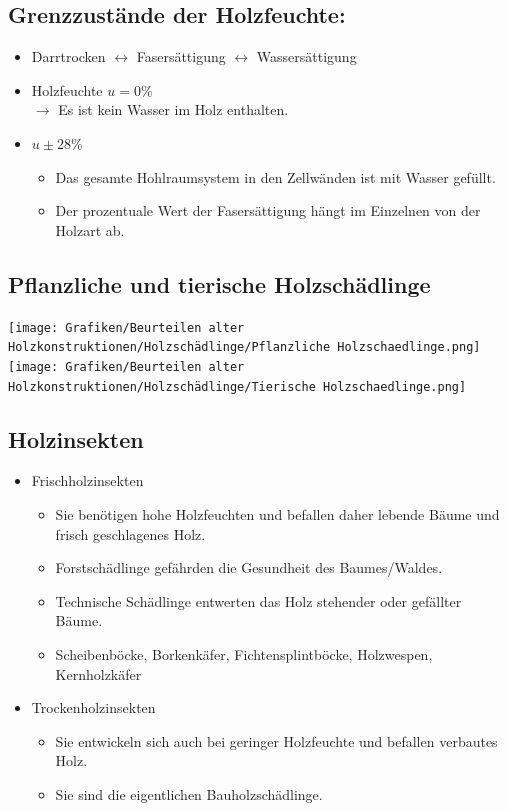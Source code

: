 \documentclass[fleqn,twoside]{article}
\begin{document}
    \subsection{Grenzzustände der Holzfeuchte:}
        \begin{itemize}
            \item Darrtrocken $\leftrightarrow$ Fasersättigung $\leftrightarrow$ Wassersättigung
        \item Holzfeuchte $u=0 \%$\\
            $\rightarrow$ Es ist kein Wasser im Holz enthalten.
        \item $u \pm 28 \%$
            \begin{itemize}
                \item Das gesamte Hohlraumsystem in den Zellwänden ist mit Wasser gefüllt.
                \item Der prozentuale Wert der Fasersättigung hängt im Einzelnen von der Holzart ab.
            \end{itemize}
        \end{itemize}
                
        
    \subsection{Pflanzliche und tierische Holzschädlinge}

        \texttt{[image: Grafiken/Beurteilen alter Holzkonstruktionen/Holzschädlinge/Pflanzliche Holzschaedlinge.png]}
        \texttt{[image: Grafiken/Beurteilen alter Holzkonstruktionen/Holzschädlinge/Tierische Holzschaedlinge.png]}
        
    \subsection{Holzinsekten}
        \begin{itemize}
            \item Frischholzinsekten
                \begin{itemize}
                    \item Sie benötigen hohe Holzfeuchten und befallen daher lebende Bäume und frisch geschlagenes Holz.
                    \item  Forstschädlinge gefährden die Gesundheit des Baumes/Waldes.
                    \item  Technische Schädlinge entwerten das Holz stehender oder gefällter Bäume.
                    \item  Scheibenböcke, Borkenkäfer, Fichtensplintböcke, Holzwespen, Kernholzkäfer
                \end{itemize}
            \item Trockenholzinsekten
                \begin{itemize}
                    \item Sie entwickeln sich auch bei geringer Holzfeuchte und befallen verbautes Holz.
                    \item Sie sind die eigentlichen Bauholzschädlinge.
                \end{itemize}
        \end{itemize}
        
\end{document}

